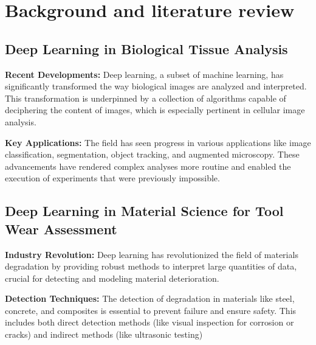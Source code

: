 \section{Background and literature review}
\label{sec:problem_description}

\subsection*{Deep Learning in Biological Tissue Analysis}

\textbf{Recent Developments:} Deep learning, a subset of machine learning, has significantly transformed the way biological images are analyzed and interpreted. This transformation is underpinned by a collection of algorithms capable of deciphering the content of images, which is especially pertinent in cellular image analysis.\cite{ref1}

\textbf{Key Applications:} The field has seen progress in various applications like image classification, segmentation, object tracking, and augmented microscopy. These advancements have rendered complex analyses more routine and enabled the execution of experiments that were previously impossible.\cite{ref2}

\subsection*{Deep Learning in Material Science for Tool Wear Assessment}

\textbf{Industry Revolution:} Deep learning has revolutionized the field of materials degradation by providing robust methods to interpret large quantities of data, crucial for detecting and modeling material deterioration.\cite{ref3}

\textbf{Detection Techniques:} The detection of degradation in materials like steel, concrete, and composites is essential to prevent failure and ensure safety. This includes both direct detection methods (like visual inspection for corrosion or cracks) and indirect methods (like ultrasonic testing)\cite{ref4}

\FloatBarrier
